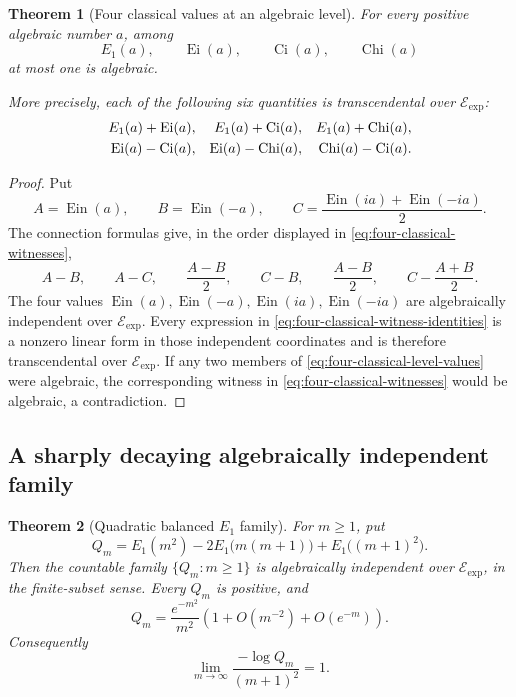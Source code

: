 \documentclass[11pt]{article}
\newtheorem{theorem}{Theorem}[section]
\theoremstyle{definition}
\theoremstyle{remark}
\newcommand{\Ein}{\operatorname{Ein}}
\newcommand{\Ei}{\operatorname{Ei}}
\newcommand{\Ci}{\operatorname{Ci}}
\newcommand{\Chi}{\operatorname{Chi}}
\newcommand{\Eexp}{\mathcal E_{\mathrm{exp}}}
\begin{document}
\begin{theorem}[Four classical values at an algebraic level]
\label{thm:four-classical-algebraic-level}
For every positive algebraic number \(a\), among
\begin{equation}\label{eq:four-classical-level-values}
 E_1(a),\qquad \Ei(a),\qquad \Ci(a),\qquad \Chi(a)
\end{equation}
at most one is algebraic.

More precisely, each of the following six quantities is transcendental over
\(\Eexp\):
\begin{align}
 E_1(a)+\Ei(a),& & E_1(a)+\Ci(a),& & E_1(a)+\Chi(a),\notag\\
 \Ei(a)-\Ci(a),& & \Ei(a)-\Chi(a),& & \Chi(a)-\Ci(a).
 \label{eq:four-classical-witnesses}
\end{align}
\end{theorem}

\begin{proof}
Put
\[
 A=\Ein(a),\qquad B=\Ein(-a),\qquad
 C=\frac{\Ein(ia)+\Ein(-ia)}2.
\]
The connection formulas give, in the order displayed in
\eqref{eq:four-classical-witnesses},
\begin{equation}\label{eq:four-classical-witness-identities}
 A-B,\qquad A-C,\qquad \frac{A-B}{2},\qquad
 C-B,\qquad \frac{A-B}{2},\qquad
 C-\frac{A+B}{2}.
\end{equation}
The four values
\(\Ein(a),\Ein(-a),\Ein(ia),\Ein(-ia)\) are algebraically independent
over \(\Eexp\).  Every expression in
\eqref{eq:four-classical-witness-identities} is a nonzero linear form in
those independent coordinates and is therefore transcendental over
\(\Eexp\).  If any two members of
\eqref{eq:four-classical-level-values} were algebraic, the corresponding
witness in \eqref{eq:four-classical-witnesses} would be algebraic, a
contradiction.
\end{proof}

\subsection{A sharply decaying algebraically independent family}

\begin{theorem}[Quadratic balanced \(E_1\) family]
\label{thm:quadratic-balanced-E1}
For \(m\geq1\), put
\begin{equation}\label{eq:quadratic-balanced-E1-definition}
 Q_m=E_1(m^2)-2E_1\bigl(m(m+1)\bigr)+E_1\bigl((m+1)^2\bigr).
\end{equation}
Then the countable family \(\{Q_m:m\geq1\}\) is algebraically independent
over \(\Eexp\), in the finite-subset sense.  Every \(Q_m\) is positive, and
\begin{equation}\label{eq:quadratic-balanced-E1-asymptotic}
 Q_m=\frac{e^{-m^2}}{m^2}
 \left(1+O(m^{-2})+O(e^{-m})\right).
\end{equation}
Consequently
\begin{equation}\label{eq:quadratic-balanced-E1-saturation}
 \boxed{
 \lim_{m\to\infty}
 \frac{-\log Q_m}{(m+1)^2}=1.}
\end{equation}
\end{theorem}
\end{document}
